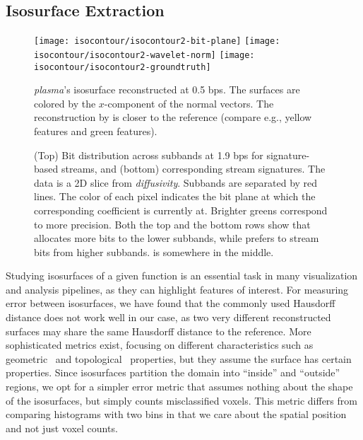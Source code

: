 \subsection{Isosurface Extraction}\label{sec:isocontour}

\begin{figure}[t]
\centering
{}
{\texttt{[image: isocontour/isocontour2-bit-plane]}}
{\texttt{[image: isocontour/isocontour2-wavelet-norm]}}
{\texttt{[image: isocontour/isocontour2-groundtruth]}}
\caption{\emph{plasma}'s isosurface reconstructed at 0.5 bps. The surfaces are colored by the
$x$-component of the normal vectors. The reconstruction by \sbit is closer to the reference (compare
e.g., yellow features and green features).}
\label{fig:isocontour-surfaces-plasma}
\vspace{-1em}
\end{figure}

\begin{figure}[t]
\centering
\caption{(Top) Bit distribution across subbands at 1.9 bps for signature-based streams, and (bottom)
corresponding stream signatures. The data is a 2D slice from \emph{diffusivity}. Subbands are
separated by red lines. The color of each pixel indicates the bit plane at which the corresponding
coefficient is currently at. Brighter greens correspond to more precision. Both the top and the
bottom rows show that \shsg allocates more bits to the lower subbands, while \slsg prefers to stream
bits from higher subbands. \srsg is somewhere in the middle.}
\label{fig:bit-distrib}
\end{figure}

Studying isosurfaces of a given function is an essential task in many visualization and analysis
pipelines, as they can highlight features of interest. For measuring error between isosurfaces, we
have found that the commonly used Hausdorff distance does not work well in our case, as two very
different reconstructed surfaces may share the same Hausdorff distance to the reference. More
sophisticated metrics exist, focusing on different characteristics such as
geometric~\cite{verifiable-isosurface} and topological~\cite{topology-verification-isosurface}
properties, but they assume the surface has certain properties. Since isosurfaces partition the
domain into ``inside'' and ``outside'' regions, we opt for a simpler error metric that assumes
nothing about the shape of the isosurfaces, but simply counts misclassified voxels. This metric
differs from comparing histograms with two bins in that we care about the spatial position and not
just voxel counts.

